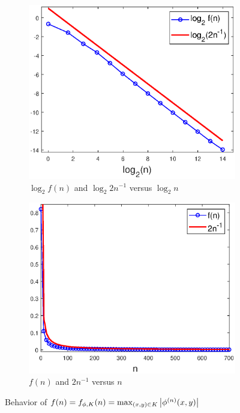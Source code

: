 \documentclass[smallextended]{svjour3}
\theoremstyle{remark}
\begin{document}
\begin{example}
\begin{figure}[!htb]
    \begin{subfigure}{0.49\textwidth}
    \centering
    \includegraphics[scale=0.4]{Fig5a.eps}
    \caption{$\log_2 f(n)$ and $\log_2 2n^{-1}$ versus $\log_2 n$}
    \end{subfigure}
    \begin{subfigure}{0.49\textwidth}
    \centering
    \includegraphics[scale=0.4]{Fig5b.eps}
    \caption{$f(n)$ and $2n^{-1}$ versus $n$}
    \end{subfigure}
    \caption{Behavior of $f(n)=f_{\phi,K}(n)=\max_{(x,y)\in K}\abs{\phi^{(n)}(x,y)}$}
    \label{fig:Conv_Pwr_0}
\end{figure}





\end{example}
\end{document}
